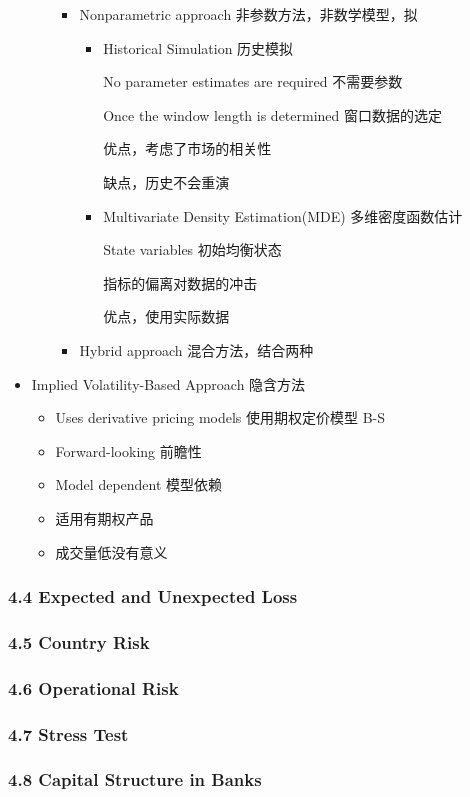 \documentclass[a4paper,6pt,twoside,openany]{article}
\begin{document}
\begin{itemize}
\begin{itemize}
\begin{itemize}
    \item Nonparametric approach 非参数方法，非数学模型，拟
      \begin{itemize}
      \item Historical Simulation 历史模拟
        \par No parameter estimates are required 不需要参数
        \par Once the window length is determined 窗口数据的选定
        \par 优点，考虑了市场的相关性
        \par 缺点，历史不会重演
      \item Multivariate Density Estimation(MDE) 多维密度函数估计
        \par State variables 初始均衡状态
        \par 指标的偏离对数据的冲击
        \par 优点，使用实际数据
      \end{itemize}
    \item Hybrid approach 混合方法，结合两种
    \end{itemize}
  \end{itemize}
\item Implied Volatility-Based Approach 隐含方法
  \begin{itemize}
  \item Uses derivative pricing models 使用期权定价模型 B-S
  \item Forward-looking 前瞻性
  \item Model dependent 模型依赖
  \item 适用有期权产品
  \item 成交量低没有意义
  \end{itemize}
\end{itemize}
\subsubsection*{4.4 Expected and Unexpected Loss}
\subsubsection*{4.5 Country Risk}
\subsubsection*{4.6 Operational Risk}
\subsubsection*{4.7 Stress Test}
\subsubsection*{4.8 Capital Structure in Banks}
\newpage
\end{document}
